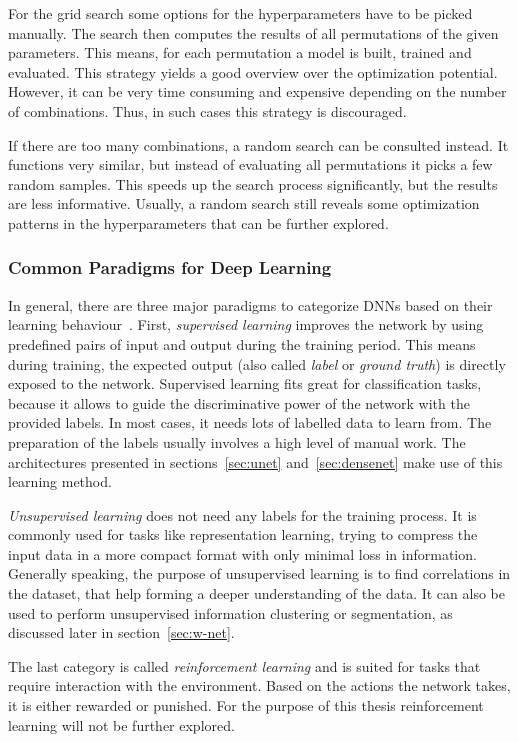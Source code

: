 For the grid search some options for the hyperparameters have to be  picked manually. The search then computes the results of all permutations of the given parameters. This means, for each permutation a model is built, trained and evaluated. This strategy yields a good overview over the optimization potential. However, it can be very time consuming and expensive depending on the number of combinations. Thus, in such cases this strategy is discouraged.

If there are too many combinations, a random search can be consulted instead.
It functions very similar, but instead of evaluating all permutations it picks a few random samples. This speeds up the search process significantly, but the results are less informative. Usually, a random search still reveals some optimization patterns in the hyperparameters that can be further explored.

\subsubsection{Common Paradigms for Deep Learning}
\label{sec:dl_paradigms}
In general, there are three major paradigms to categorize DNNs based on their learning behaviour~\cite[p.~214f]{dlma14}. First, \emph{supervised learning} improves the network by using predefined pairs of input and output during the training period. This means during training, the expected output (also called \emph{label} or \emph{ground truth}) is directly exposed to the network. Supervised learning fits great for classification tasks, because it allows to guide the discriminative power of the network with the provided labels. In most cases, it needs lots of labelled data to learn from. The preparation of the labels usually involves a high level of manual work. The architectures presented in sections~\ref{sec:unet} and~\ref{sec:densenet} make use of this learning method.

\emph{Unsupervised learning} does not need any labels for the training process. It is commonly used for tasks like representation learning, trying to compress the input data in a more compact format with only minimal loss in information. Generally speaking, the purpose of unsupervised learning is to find correlations in the dataset, that help forming a deeper understanding of the data. It can also be used to perform unsupervised information clustering or segmentation, as discussed later in section~\ref{sec:w-net}.

The last category is called \emph{reinforcement learning} and is suited for tasks that require interaction with the environment. Based on the actions the network takes, it is either rewarded or punished. For the purpose of this thesis reinforcement learning will not be further explored.

